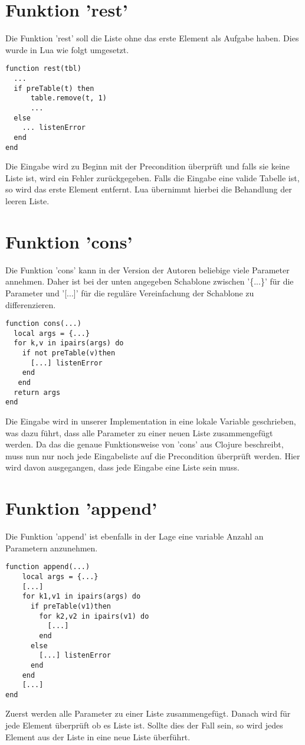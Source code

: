\section{Funktion 'rest'}
Die Funktion 'rest' soll die Liste ohne das erste Element als Aufgabe haben. Dies wurde in Lua wie folgt umgesetzt.

\begin{lstlisting}
function rest(tbl)
  ...
  if preTable(t) then
      table.remove(t, 1)
      ...
  else
    ... listenError
  end
end
\end{lstlisting}

Die Eingabe wird zu Beginn mit der Precondition überprüft und falls sie keine Liste ist, wird ein Fehler zurückgegeben. Falls die Eingabe eine valide Tabelle ist, so wird das erste Element entfernt. Lua übernimmt hierbei die Behandlung der leeren Liste.


\section{Funktion 'cons'}
Die Funktion 'cons' kann in der Version der Autoren beliebige viele Parameter annehmen. Daher ist bei der unten angegeben Schablone zwischen '\{...\}' für die Parameter und '[...]' für die reguläre Vereinfachung der Schablone zu differenzieren.

\begin{lstlisting}
function cons(...)
  local args = {...}
  for k,v in ipairs(args) do
    if not preTable(v)then
      [...] listenError
    end
   end
  return args
end
\end{lstlisting}

Die Eingabe wird in unserer Implementation in eine lokale Variable geschrieben, was dazu führt, dass alle Parameter zu einer neuen Liste zusammengefügt werden. Da das die genaue Funktionsweise von 'cons' aus Clojure beschreibt, muss nun nur noch jede Eingabeliste auf die Precondition überprüft werden. Hier wird davon ausgegangen, dass jede Eingabe eine Liste sein muss.

\section{Funktion 'append'}
Die Funktion 'append' ist ebenfalls in der Lage eine variable Anzahl an Parametern anzunehmen.

\begin{lstlisting}
function append(...)
    local args = {...}
    [...]
    for k1,v1 in ipairs(args) do
      if preTable(v1)then
        for k2,v2 in ipairs(v1) do 
          [...]
        end
      else
        [...] listenError
      end
    end
    [...]
end
\end{lstlisting}

Zuerst werden alle Parameter zu einer Liste zusammengefügt. Danach wird für jede Element überprüft ob es Liste ist. Sollte dies der Fall sein, so wird jedes Element aus der Liste in eine neue Liste überführt.


\printbibliography
{}

